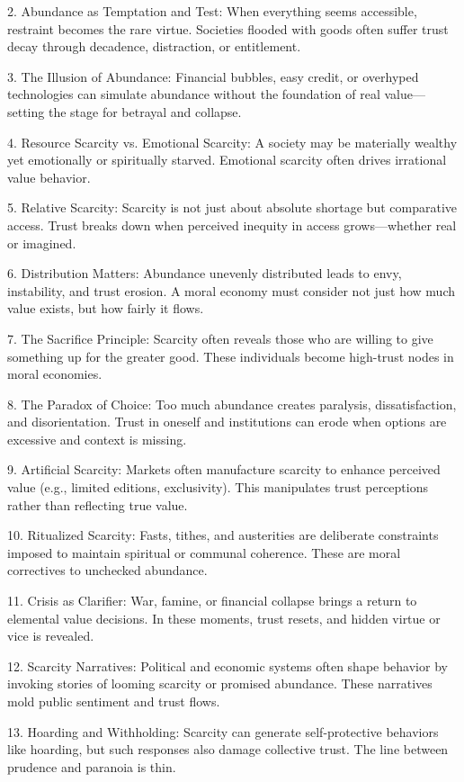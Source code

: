\documentclass[11pt,oneside]{book}
\begin{document}
2. Abundance as Temptation and Test: When everything seems accessible, restraint becomes the rare virtue. Societies flooded with goods often suffer trust decay through decadence, distraction, or entitlement.

3. The Illusion of Abundance: Financial bubbles, easy credit, or overhyped technologies can simulate abundance without the foundation of real value—setting the stage for betrayal and collapse.

4. Resource Scarcity vs. Emotional Scarcity: A society may be materially wealthy yet emotionally or spiritually starved. Emotional scarcity often drives irrational value behavior.

5. Relative Scarcity: Scarcity is not just about absolute shortage but comparative access. Trust breaks down when perceived inequity in access grows—whether real or imagined.

6. Distribution Matters: Abundance unevenly distributed leads to envy, instability, and trust erosion. A moral economy must consider not just how much value exists, but how fairly it flows.

7. The Sacrifice Principle: Scarcity often reveals those who are willing to give something up for the greater good. These individuals become high-trust nodes in moral economies.

8. The Paradox of Choice: Too much abundance creates paralysis, dissatisfaction, and disorientation. Trust in oneself and institutions can erode when options are excessive and context is missing.

9. Artificial Scarcity: Markets often manufacture scarcity to enhance perceived value (e.g., limited editions, exclusivity). This manipulates trust perceptions rather than reflecting true value.

10. Ritualized Scarcity: Fasts, tithes, and austerities are deliberate constraints imposed to maintain spiritual or communal coherence. These are moral correctives to unchecked abundance.

11. Crisis as Clarifier: War, famine, or financial collapse brings a return to elemental value decisions. In these moments, trust resets, and hidden virtue or vice is revealed.

12. Scarcity Narratives: Political and economic systems often shape behavior by invoking stories of looming scarcity or promised abundance. These narratives mold public sentiment and trust flows.

13. Hoarding and Withholding: Scarcity can generate self-protective behaviors like hoarding, but such responses also damage collective trust. The line between prudence and paranoia is thin.
\end{document}
